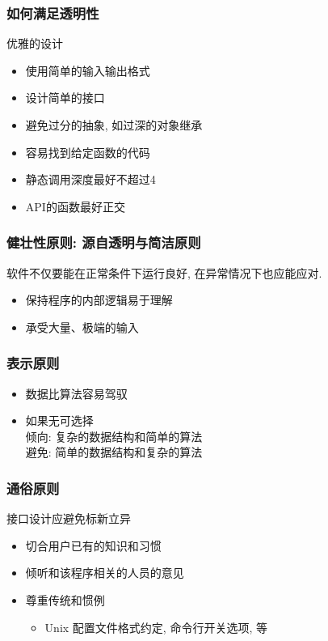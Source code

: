 \documentclass[compress]{beamer}
\begin{document}
\begin{frame}
  \frametitle{如何满足透明性}
  \begin{block}{优雅的设计}
  \begin{itemize}
	\item 使用简单的输入输出格式
	\item 设计简单的接口
	\item 避免过分的抽象, 如过深的对象继承
	\item 容易找到给定函数的代码
	\item 静态调用深度最好不超过4
	\item API的函数最好正交
  \end{itemize}
 \end{block} 
\end{frame}

\begin{frame}
\frametitle{健壮性原则: 源自透明与简洁原则}

软件不仅要能在正常条件下运行良好, 在异常情况下也应能应对. 

\begin{itemize}
  \item 保持程序的内部逻辑易于理解
  \item 承受大量、极端的输入
\end{itemize}

\end{frame}

\begin{frame}
\frametitle{表示原则}
\begin{itemize}
\item 数据比算法容易驾驭
\item 如果无可选择\\
  倾向: 复杂的数据结构和简单的算法\\
  避免: 简单的数据结构和复杂的算法
\end{itemize}

\end{frame}

\begin{frame}
\frametitle{通俗原则}
\begin{block} {接口设计应避免标新立异}

\begin{itemize}
\item 切合用户已有的知识和习惯
\item 倾听和该程序相关的人员的意见
\item 尊重传统和惯例
    \begin{itemize}
    \item Unix 配置文件格式约定, 命令行开关选项, 等
    \end{itemize}
\end{itemize}
\end{block}
\end{frame}
\end{document}
